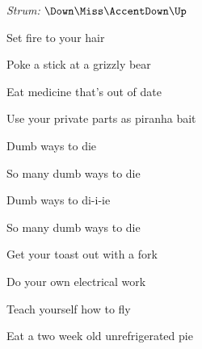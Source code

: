 \begin{song}


\begin{headerbox}
\RaiseBoxWithAccents
{} \quad
\textit{Strum:} $\Down\Miss\AccentDown\Up$
\end{headerbox}

\begin{vchordbox}
\end{vchordbox}

\large

\bigskip

\Intro {}   \par

\bigskip

Set fire to your hair  \par
Poke a stick at a grizzly bear  \par
Eat medicine that’s out of date \par
Use your private parts as piranha bait \par

\bigskip

\begin{chorusbox}{\Chorus}
Dumb ways to die  \par
So many dumb ways to die  \par
{}Dumb ways to di-i-ie \par
So many dumb ways to die  \par
\end{chorusbox}

\bigskip

 

\bigskip

Get your toast out  with a fork  \par
Do your own electrical work  \par
{}Teach yourself how to fly  \par
Eat a two week old unrefrigerated pie \par


\end{song}
